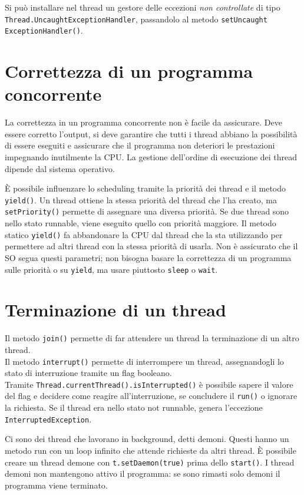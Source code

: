 Si può installare nel thread un gestore delle eccezioni \textit{non controllate} di tipo \texttt{Thread.UncaughtExceptionHandler}, passandolo al metodo \texttt{setUncaught ExceptionHandler()}.

\section{Correttezza di un programma concorrente}
La correttezza in un programma concorrente non è facile da assicurare. Deve essere corretto l'output, si deve garantire che tutti i thread abbiano la possibilità di essere eseguiti e assicurare che il programma non deteriori le prestazioni impegnando inutilmente la CPU.
La gestione dell'ordine di esecuzione dei thread dipende dal sistema operativo.

È possibile influenzare lo scheduling tramite la priorità dei thread e il metodo \texttt{yield()}.
Un thread ottiene la stessa priorità del thread che l'ha creato, ma \texttt{setPriority()} permette di assegnare una diversa priorità. Se due thread sono nello stato runnable, viene eseguito quello con priorità maggiore.
Il metodo statico \texttt{yield()} fa abbandonare la CPU dal thread che la sta utilizzando per permettere ad altri thread con la stessa priorità di usarla.
Non è assicurato che il SO segua questi parametri; non bisogna basare la correttezza di un programma sulle priorità o su \texttt{yield}, ma usare piuttosto \texttt{sleep} o \texttt{wait}.

\section{Terminazione di un thread}
Il metodo \texttt{join()}  permette di far attendere un thread la terminazione di un altro thread. \\
Il metodo \texttt{interrupt()} permette di interrompere un thread, assegnandogli lo stato di interruzione tramite un flag booleano. \\ Tramite \texttt{Thread.currentThread().isInterrupted()} è possibile sapere il valore del flag e decidere come reagire all'interruzione, se concludere il \texttt{run()} o ignorare la richiesta. Se il thread era nello stato not runnable, genera l'eccezione \texttt{InterruptedException}.

Ci sono dei thread che lavorano in background, detti demoni. Questi hanno un metodo run con un loop infinito che attende richieste da altri thread. È possibile creare un thread demone con \texttt{t.setDaemon(true)} prima dello \texttt{start()}. I thread demoni non mantengono attivo il programma: se sono rimasti solo demoni il programma viene terminato.

